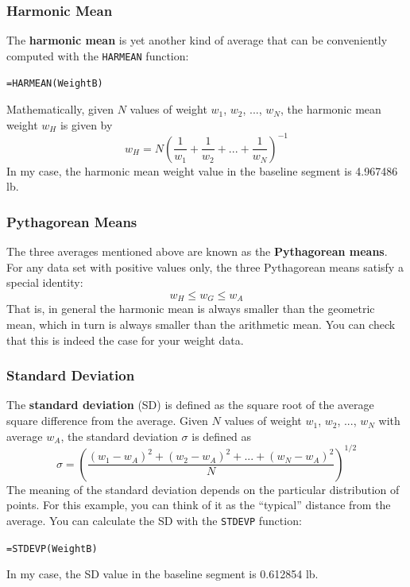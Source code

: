 \subsubsection{Harmonic Mean}
The \textbf{harmonic mean} is yet another kind of average that can be conveniently computed with the \texttt{HARMEAN} function:
\begin{center}
    \texttt{=HARMEAN(WeightB)}
\end{center}
Mathematically, given $N$ values of weight $w_{1}$, $w_{2}$, ..., $w_{N}$, the harmonic mean weight $w_{H}$ is given by
\begin{equation}
    w_{H} = N \left( \frac{1}{w_{1}} + \frac{1}{w_{2}} + ... + \frac{1}{w_{N}} \right)^{-1}
\end{equation}
In my case, the harmonic mean weight value in the baseline segment is 4.967486 lb.
\subsubsection{Pythagorean Means}
The three averages mentioned above are known as the \textbf{Pythagorean means}. For any data set with positive values only, the three Pythagorean means satisfy a special identity:
\begin{equation}
    w_{H} \leq w_{G} \leq w_{A}
\end{equation}
That is, in general the harmonic mean is always smaller than the geometric mean, which in turn is always smaller than the arithmetic mean. You can check that this is indeed the case for your weight data.
\subsubsection{Standard Deviation}
The \textbf{standard deviation} (SD) is defined as the square root of the average square difference from the average. Given $N$ values of weight $w_{1}$, $w_{2}$, ..., $w_{N}$ with average $w_{A}$, the standard deviation $\sigma$ is defined as
\begin{equation}
    \sigma = \left( \frac{(w_{1} - w_{A})^{2} + (w_{2} - w_{A})^{2} + ... + (w_{N} - w_{A})^{2}}{N}  \right)^{1/2}
\end{equation}
The meaning of the standard deviation depends on the particular distribution of points. For this example, you can think of it as the ``typical'' distance from the average. You can calculate the SD with the \texttt{STDEVP} function:
\begin{center}
    \texttt{=STDEVP(WeightB)}
\end{center}
In my case, the SD value in the baseline segment is 0.612854 lb.
